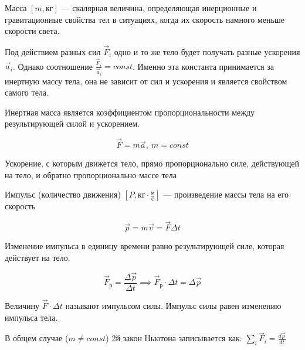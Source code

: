 \begin{definition}
    Масса $[m, кг]$ — скалярная величина, определяющая инерционные и гравитационные свойства тел в ситуациях, когда их скорость намного меньше скорости света.
\end{definition}

Под действием разных сил $\vec F_i$ одно и то же тело будет получать разные ускорения $\vec a_i$. Однако соотношение $\displaystyle\frac{\vec F_i}{\vec a_i}=const$. Именно эта константа принимается за инертную массу тела, она не зависит от сил и ускорения и является свойством самого тела.

Инертная масса является коэффициентом пропорциональности между результирующей силой и ускорением.

$$\vec F=m\vec a,\ m=const$$

\begin{remark}
    Ускорение, с которым движется тело, прямо пропорционально силе, действующей на тело, и обратно пропорционально массе тела
\end{remark}

\begin{definition}
    Импульс (количество движения) $[P,кг\cdot\frac{м}{с}]$ — произведение массы тела на его скорость
\end{definition}

$$\vec p=m\vec\upsilon=\vec F\Delta t$$

Изменение импульса в единицу времени равно результирующей силе, которая действует на тело.

$$\vec F_р=\frac{\Delta\vec p}{\Delta t}\implies\vec F_р\cdot\Delta t=\Delta\vec p$$

\begin{definition}
    Величину $\vec F\cdot\Delta t$ называют импульсом силы. Импульс силы равен изменению импульса тела.
\end{definition}

\begin{remark}
    В общем случае ($m\ne const$) 2й закон Ньютона записывается как: $\sum\limits_i\vec F_i=\frac{d\vec p}{dt}$
\end{remark}